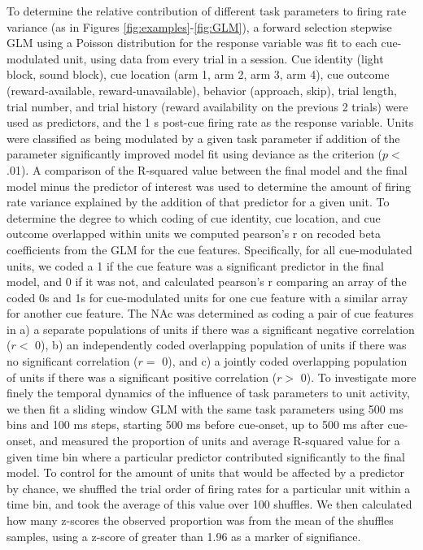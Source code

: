 \documentclass[11pt]{article}
\begin{document}
To determine the relative contribution of different task parameters to firing rate variance (as in Figures \ref{fig:examples}-\ref{fig:GLM}), a forward selection stepwise GLM using a Poisson distribution for the response variable was fit to each cue-modulated unit, using data from every trial in a session. Cue identity (light block, sound block), cue location (arm 1, arm 2, arm 3, arm 4), cue outcome (reward-available, reward-unavailable), behavior (approach, skip), trial length, trial number, and trial history (reward availability on the previous 2 trials) were used as predictors, and the 1 s post-cue firing rate as the response variable. Units were classified as being modulated by a
given task parameter if addition of the parameter significantly
improved model fit using deviance as the criterion ($p <$ .01). A
comparison of the R-squared value between the final model and the
final model minus the predictor of interest was used to determine the
amount of firing rate variance explained by the addition of that
predictor for a given unit. To determine the degree to which coding of
cue identity, cue location, and cue outcome overlapped within units we
computed pearson’s r on recoded beta coefficients from the GLM for the
cue features. Specifically, for all cue-modulated units, we coded a 1
if the cue feature was a significant predictor in the final model, and
0 if it was not, and calculated pearson’s r comparing an array of the
coded 0s and 1s for cue-modulated units for one cue feature with a
similar array for another cue feature. The NAc was determined as
coding a pair of cue features in a) a separate populations of units if
there was a significant negative correlation ($r < $ 0), b) an
independently coded overlapping population of units if there was no
significant correlation ($r = $ 0), and c) a jointly coded overlapping
population of units if there was a significant positive correlation
($r > $ 0). To investigate more finely the temporal dynamics of the influence of task parameters to unit activity, we then fit a sliding window GLM with the same task parameters using 500 ms bins and 100 ms steps, starting 500 ms before cue-onset, up to 500 ms after cue-onset, and measured the proportion of units and average R-squared value for a given time bin where a particular predictor contributed significantly to the final model. To control for the amount of units that would be affected by a predictor by chance, we shuffled the trial order of firing rates for a particular unit within a time bin, and took the average of this value over 100 shuffles. We then calculated how many z-scores the observed proportion was from the mean of the shuffles samples, using a z-score of greater than 1.96 as a marker of signifiance.
\end{document}
